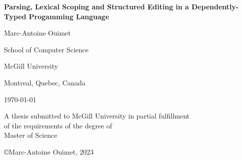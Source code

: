 \begin{titlepage}
\centering

\vspace*{0.5cm}

{\bfseries\LARGE Parsing, Lexical Scoping and Structured Editing in a Dependently-Typed Progamming Language}

\vspace{1.8cm}

{\large Marc-Antoine Ouimet}

\vspace{2cm}

School of Computer Science

McGill University

Montreal, Quebec, Canada

\vspace{1.5cm}

\monthyeardate\today

\vspace{2cm}

A thesis submitted to McGill University in partial fulfillment\\
of the requirements of the degree of\\
Master of Science

\vfill

\copyright Marc-Antoine Ouimet, 2023
\end{titlepage}
